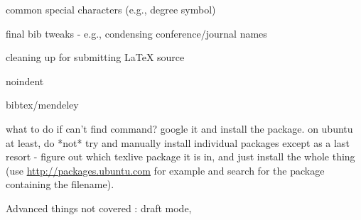 \documentclass{sigchi}
\begin{document}
common special characters (e.g.,  degree symbol)

final bib tweaks - e.g., condensing conference/journal names

cleaning up for submitting LaTeX source

noindent

bibtex/mendeley

what to do if can't find command? google it and install the package. on ubuntu at least, do *not* try and manually install individual packages except as a last resort - figure out which texlive package it is in, and just install the whole thing (use \url{http://packages.ubuntu.com} for example and search for the package containing the filename).

Advanced things not covered : draft mode, 

%
%
%
%
%
\balance{}



\end{document}
